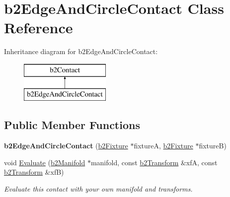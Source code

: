 \hypertarget{classb2_edge_and_circle_contact}{\section{b2\-Edge\-And\-Circle\-Contact Class Reference}
\label{classb2_edge_and_circle_contact}
}
Inheritance diagram for b2\-Edge\-And\-Circle\-Contact\-:\begin{figure}[H]
\begin{center}
\leavevmode
\includegraphics[height=2.000000cm]{classb2_edge_and_circle_contact}
\end{center}
\end{figure}
\subsection*{Public Member Functions}
\begin{DoxyCompactItemize}
\item 
\hypertarget{classb2_edge_and_circle_contact_a9de91d6afe4d2407f679b2ccaded9c02}{{\bfseries b2\-Edge\-And\-Circle\-Contact} (\hyperlink{classb2_fixture}{b2\-Fixture} $\ast$fixture\-A, \hyperlink{classb2_fixture}{b2\-Fixture} $\ast$fixture\-B)}\label{classb2_edge_and_circle_contact_a9de91d6afe4d2407f679b2ccaded9c02}

\item 
\hypertarget{classb2_edge_and_circle_contact_a8f083c4c7c7da83eae38975164fd1452}{void \hyperlink{classb2_edge_and_circle_contact_a8f083c4c7c7da83eae38975164fd1452}{Evaluate} (\hyperlink{structb2_manifold}{b2\-Manifold} $\ast$manifold, const \hyperlink{structb2_transform}{b2\-Transform} \&xf\-A, const \hyperlink{structb2_transform}{b2\-Transform} \&xf\-B)}\label{classb2_edge_and_circle_contact_a8f083c4c7c7da83eae38975164fd1452}

\begin{DoxyCompactList}\small\item\em Evaluate this contact with your own manifold and transforms. \end{DoxyCompactList}\end{DoxyCompactItemize}
